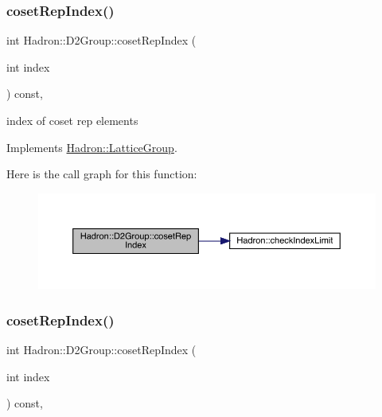 \subsubsection{\texorpdfstring{cosetRepIndex()}{cosetRepIndex()}\hspace{0.1cm}{\footnotesize\ttfamily [1/2]}}
{\footnotesize\ttfamily int Hadron\+::\+D2\+Group\+::coset\+Rep\+Index (\begin{DoxyParamCaption}\item[{int}]{index }\end{DoxyParamCaption}) const\hspace{0.3cm}{\ttfamily [inline]}, {\ttfamily [virtual]}}

index of coset rep elements 

Implements \mbox{\hyperlink{structHadron_1_1LatticeGroup_a7e3b9b5e2f596e6c40d64aa939a3ad6c}{Hadron\+::\+Lattice\+Group}}.

Here is the call graph for this function\+:
\nopagebreak
\begin{figure}[H]
\begin{center}
\leavevmode
\includegraphics[width=350pt]{d8/de7/structHadron_1_1D2Group_a41bfcefe5a659b99db790f822123593f_cgraph}
\end{center}
\end{figure}
\mbox{\label{structHadron_1_1D2Group_a41bfcefe5a659b99db790f822123593f}} 
\subsubsection{\texorpdfstring{cosetRepIndex()}{cosetRepIndex()}\hspace{0.1cm}{\footnotesize\ttfamily [2/2]}}
{\footnotesize\ttfamily int Hadron\+::\+D2\+Group\+::coset\+Rep\+Index (\begin{DoxyParamCaption}\item[{int}]{index }\end{DoxyParamCaption}) const\hspace{0.3cm}{\ttfamily [inline]}, {\ttfamily [virtual]}}

